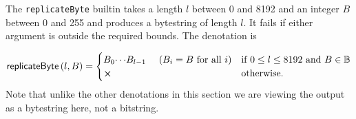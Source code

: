 \label{note:replicateByte}
The \texttt{replicateByte} builtin takes a length $l$ between 0 and 8192 and an
integer $B$ between 0 and 255 and produces a bytestring of length $l$.  It fails
if either argument is outside the required bounds.  The denotation is

$$
\mathsf{replicateByte}\,(l,B) =
\begin{cases}
B_0{\cdots}B_{l-1} \quad\text{ ($B_i=B$ for all $i$}) & \text{if $0 \leq l \leq 8192$ and $B \in \B$}\\
\errorX      & \text{otherwise}.
\end{cases}
$$
\noindent Note that unlike the other denotations in this section we are
viewing the output as a bytestring here, not a bitstring.
